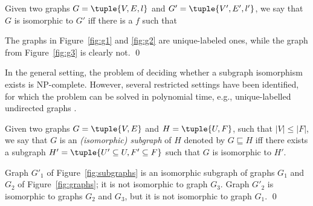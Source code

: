 

\begin{definition}\label{def:isom}
    Given two graphs $G=\tuple{V,E,l}$ and $G'=\tuple{V',E',l'}$, we say that $G$ is isomorphic to $G'$ iff there is a  $f$ such that 
\end{definition}


\begin{example}
    The graphs in Figure~\ref{fig:g1} and \ref{fig:g2} are unique-labeled ones, while the graph from Figure~\ref{fig:g3} is clearly not. \qed
\end{example}

In the general setting, the problem of deciding whether a subgraph isomorphism exists is NP-complete. However, several restricted settings have been identified, for which the problem can be solved in polynomial time, e.g., unique-labelled undirected graphs \parencite{DBLP:journals/corr/abs-1709-00900}.

\begin{definition}\label{def:subgraph}
    Given two graphs $G = \tuple{V,E}$ and $H=\tuple{U, F}$, such that $|V|\leq |F|$, we say that $G$ is an \emph{(isomorphic) subgraph} of $H$  denoted by $G \sqsubseteq H$ iff there exists a subgraph $H' = \tuple{U'\subseteq U, F'\subseteq F}$ such that $G$ is isomorphic to $H'$.
\end{definition}

\begin{example}
    Graph $G'_1$ of Figure~\ref{fig:subgraphs} is an isomorphic subgraph of graphs $G_1$ and $G_2$ of Figure~\ref{fig:graphs}; it is not isomorphic to graph $G_3$. Graph $G'_2$ is isomorphic to graphs $G_2$ and $G_3$, but it is not isomorphic to graph $G_1$.  \qed
\end{example}

